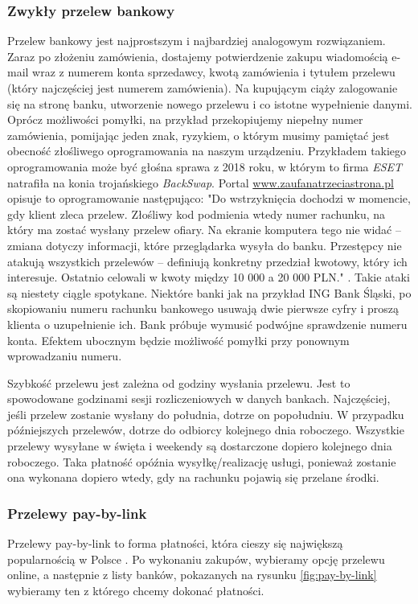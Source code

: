 \documentclass[12pt]{article}
\numberwithin{figure}{section}
\begin{document}
\begin{sloppypar}
\subsubsection{Zwykły przelew bankowy}
Przelew bankowy jest najprostszym i najbardziej analogowym rozwiązaniem. Zaraz po złożeniu zamówienia, dostajemy potwierdzenie zakupu wiadomością e-mail wraz z numerem konta sprzedawcy, kwotą zamówienia i tytułem przelewu (który najczęściej jest numerem zamówienia). Na kupującym ciąży zalogowanie się na stronę banku, utworzenie nowego przelewu i co istotne wypełnienie danymi. Oprócz możliwości pomyłki, na przykład przekopiujemy niepełny numer zamówienia, pomijając jeden znak, ryzykiem, o którym musimy pamiętać jest obecność złośliwego oprogramowania na naszym urządzeniu. Przykładem takiego oprogramowania może być głośna sprawa z 2018 roku, w którym to firma \textit{ESET} natrafiła na konia trojańskiego \textit{BackSwap}. Portal \url{www.zaufanatrzeciastrona.pl} opisuje to oprogramowanie następująco: "Do wstrzyknięcia dochodzi w momencie, gdy klient zleca przelew. Złośliwy kod podmienia wtedy numer rachunku, na który ma zostać wysłany przelew ofiary. Na ekranie komputera tego nie widać – zmiana dotyczy informacji, które przeglądarka wysyła do banku. Przestępcy nie atakują wszystkich przelewów – definiują konkretny przedział kwotowy, który ich interesuje. Ostatnio celowali w kwoty między 10 000 a 20 000 PLN." \cite{backswap}.
Takie ataki są niestety ciągle spotykane. Niektóre banki jak na przykład ING Bank Śląski, po skopiowaniu numeru rachunku bankowego usuwają dwie pierwsze cyfry i proszą klienta o uzupełnienie ich. Bank próbuje wymusić podwójne sprawdzenie numeru konta. Efektem ubocznym będzie możliwość pomyłki przy ponownym wprowadzaniu numeru.

Szybkość przelewu jest zależna od godziny wysłania przelewu. Jest to spowodowane godzinami sesji rozliczeniowych w danych bankach. Najczęściej, jeśli przelew zostanie wysłany do południa, dotrze on popołudniu. W przypadku późniejszych przelewów, dotrze do odbiorcy kolejnego dnia roboczego. Wszystkie przelewy wysyłane w święta i weekendy są dostarczone dopiero kolejnego dnia roboczego. Taka płatność opóźnia wysyłkę/realizację usługi, ponieważ zostanie ona wykonana dopiero wtedy, gdy na rachunku pojawią się przelane środki. 

\subsubsection{Przelewy pay-by-link}
Przelewy pay-by-link to forma płatności, która cieszy się największą popularnością w Polsce \cite{jak-placa-polacy}. Po wykonaniu zakupów, wybieramy opcję przelewu online, a następnie z listy banków, pokazanych na rysunku \ref{fig:pay-by-link} wybieramy ten z którego chcemy dokonać płatności. 


\end{sloppypar}
\end{document}
